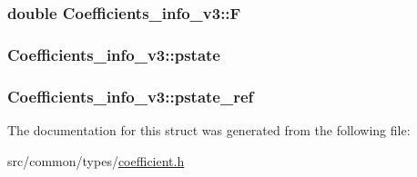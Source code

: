 \subsubsection[{\texorpdfstring{F}{F}}]{\setlength{\rightskip}{0pt plus 5cm}double Coefficients\+\_\+info\+\_\+v3\+::F}\hypertarget{structCoefficients__info__v3_a1af4d0fbc6523a1172115b330ed60edd}{}\label{structCoefficients__info__v3_a1af4d0fbc6523a1172115b330ed60edd}
\subsubsection[{\texorpdfstring{pstate}{pstate}}]{ Coefficients\+\_\+info\+\_\+v3\+::pstate}\hypertarget{structCoefficients__info__v3_a4aa51829fee753e73adf63784ed53f94}{}\label{structCoefficients__info__v3_a4aa51829fee753e73adf63784ed53f94}
\subsubsection[{\texorpdfstring{pstate\+\_\+ref}{pstate_ref}}]{ Coefficients\+\_\+info\+\_\+v3\+::pstate\+\_\+ref}\hypertarget{structCoefficients__info__v3_a194ea05d7255ee1e16400df7764c7a48}{}\label{structCoefficients__info__v3_a194ea05d7255ee1e16400df7764c7a48}


The documentation for this struct was generated from the following file\+:\begin{DoxyCompactItemize}
\item 
src/common/types/\hyperlink{coefficient_8h}{coefficient.\+h}\end{DoxyCompactItemize}

